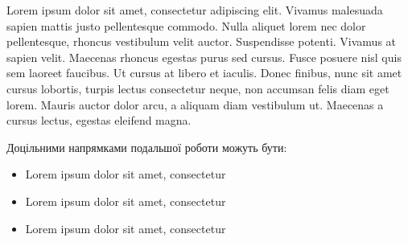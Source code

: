 \conclusions

Lorem ipsum dolor sit amet, consectetur adipiscing elit. Vivamus malesuada sapien mattis justo pellentesque commodo. 
Nulla aliquet lorem nec dolor pellentesque, rhoncus vestibulum velit auctor. Suspendisse potenti. Vivamus at sapien velit.
 Maecenas rhoncus egestas purus sed cursus. Fusce posuere nisl quis sem laoreet faucibus. Ut cursus at libero et iaculis. 
 Donec finibus, nunc sit amet cursus lobortis, turpis lectus consectetur neque, non accumsan felis diam eget lorem. Mauris 
 auctor dolor arcu, a aliquam diam vestibulum ut. Maecenas a cursus lectus, egestas eleifend magna.


Доцільними напрямками подальшої роботи можуть бути:

\begin{itemize}
    \item Lorem ipsum dolor sit amet, consectetur
    \item Lorem ipsum dolor sit amet, consectetur
    \item Lorem ipsum dolor sit amet, consectetur
\end{itemize}
